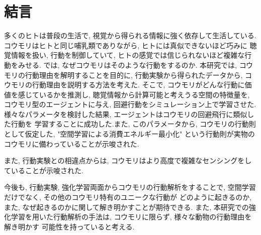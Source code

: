 \documentclass[../main]{subfiles}
\begin{document}
\newpage
\chapter*{結言}
\label{chap:summary}
多くのヒトは普段の生活で, 
視覚から得られる情報に強く依存して生活している.
コウモリはヒトと同じ哺乳類でありながら, 
ヒトには真似できないほど巧みに
聴覚情報を扱い, 行動を制御していて, 
ヒトの感覚では信じられないほど複雑な行動をみせる.
では, なぜコウモリはそのような行動をするのか.
本研究では, コウモリの行動理由を解明することを目的に, 
行動実験から得られたデータから, 
コウモリの行動理由を説明する方法を考えた.
そこで, コウモリがどんな行動に価値を感じているかを推測し, 
聴覚情報から計算可能と考えうる空間の特徴量を, 
コウモリ型のエージェントに与え, 
回避行動をシミュレーション上で学習させた.
様々なパラメータを検討した結果, 
エージェントはコウモリの回避飛行に類似した行動を
学習することに成功した.また, 
このパラメータから, 
コウモリの行動則として仮定した, 
"空間学習による消費エネルギー最小化"
という行動則が実物のコウモリに備わっていることが示唆された.

また, 行動実験との相違点からは, 
コウモリはより高度で複雑なセンシングをしていることが示唆された.

今後も, 行動実験, 強化学習両面からコウモリの行動解析をすることで, 
空間学習だけでなく, その他のコウモリ特有のユニークな行動が
どのように起きるのか, 
また, なぜ起きるのかに関して解き明かすことが期待できる.
また, 本研究での強化学習を用いた行動解析の手法は, 
コウモリに限らず, 様々な動物の行動理由を解き明かす
可能性を持っていると考える.
\end{document}
